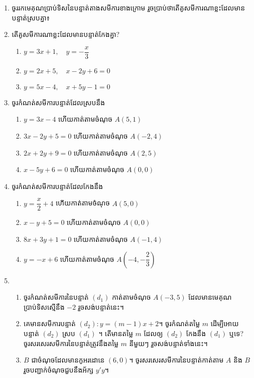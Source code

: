 \begin{enumerate}
\item  ចូររកមេគុណប្រាប់ទិសនៃបន្ទាត់តាងសមីការខាងក្រោម រួចប្រាប់ថាតើគូសមីការណាខ្លះដែលមានបន្ទាត់ស្របគ្នា៖
\begin{enumerate}[label=\alph*.]
\end{enumerate}
\item តើគូសមីការណាខ្លះដែលមានបន្ទាត់កែងគ្នា?
\begin{enumerate}[label=\alph*.]
\item $y=3x+1,\quad y=-\dfrac{x}{3}$
\item $y=2x+5,\quad x-2y+6=0$
\item $y=5x-4,\quad x+5y-1=0$
\end{enumerate}

\item ចូរកំណត់សមីការបន្ទាត់ដែលស្របនឹង
\begin{enumerate}[label=\alph*.]
\item $y=3x-4$ ហើយកាត់តាមចំណុច $A(5,1)$
\item $3x-2y+5=0$ ហើយកាត់តាមចំណុច $A(-2,4)$
\item $2x+2y+9=0$ ហើយកាត់តាមចំណុច $A(2,5)$
\item $x-5y+6=0$ ហើយកាត់តាមចំណុច $A(0,0)$
\end{enumerate}

\item ចូរកំណត់សមីការបន្ទាត់ដែលកែងនឹង
\begin{enumerate}[label=\alph*.]
\item $y=\dfrac{x}{2}+4$ ហើយកាត់តាមចំណុច $A(5,0)$
\item $x-y+5=0$ ហើយកាត់តាមចំណុច $A(0,0)$
\item $8x+3y+1=0$ ហើយកាត់តាមចំណុច $A(-1,4)$
\item $y=-x+6$ ហើយកាត់តាមចំណុច $A(-4,-\dfrac{2}{3})$
\end{enumerate}

\item  
\begin{enumerate}[label=\alph*.]
\item ចូរកំណត់សមីការនៃបន្ទាត់ $(d_1)$ កាត់តាមចំណុច $A(-3,5)$ ដែលមានមេគុណប្រាប់ទិសស្មើនឹង $-2$ រួចសង់បន្ទាត់នេះ។
\item គេមានសមីការបន្ទាត់ $(d_2): y=(m-1)x+2$។ ចូរកំណត់តម្លៃ $m$ ដើម្បីអោយបន្ទាត់ $(d_2)$ ស្រប $(d_1)$ ។ តើមានតម្លៃ $m$ ដែលឲ្យ $(d_2)$ កែងនឹង $(d_1)$ ឬទេ? ចូរសរសេរសមីការនៃបន្ទាត់ត្រូវនឹងតម្លៃ $m$ នីមួយៗ រួចសង់បន្ទាត់ទាំងនេះ។
\item  $B$ ជាចំណុចដែលមានកូអរដោនេ $(6,0)$។ ចូរសរសេរសមីការនៃបន្ទាត់កាត់តាម $A$ និង $B$ រួចបញ្ជាក់ចំណុចជួបនឹងអ័ក្ស $y'y$។
\end{enumerate}


\end{enumerate}
